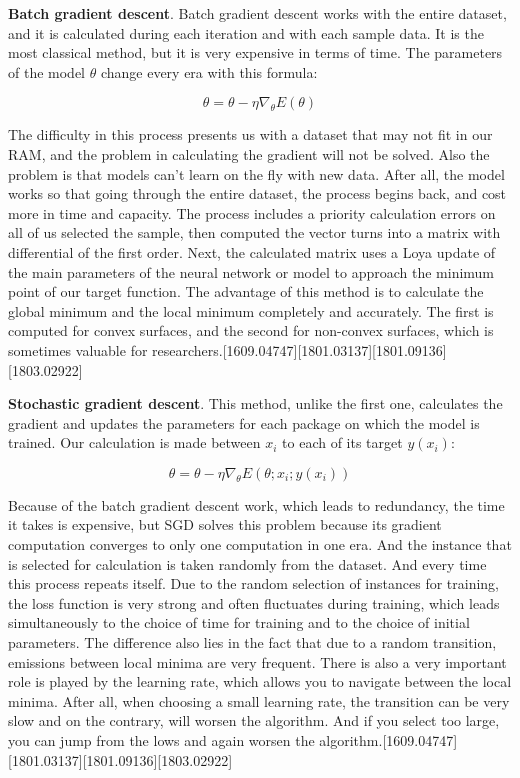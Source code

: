 \par \textbf{Batch gradient descent}. Batch gradient descent works with the entire dataset, and it is calculated during each iteration and with each sample data. It is the most classical method, but it is very expensive in terms of time. The parameters of the model $\theta$ change every era with this formula:


\begin{equation}
\theta = \theta - \eta\nabla_{\theta}E(\theta)
\end{equation}

\par The difficulty in this process presents us with a dataset that may not fit in our RAM, and the problem in calculating the gradient will not be solved. Also the problem is that models can't learn on the fly with new data. After all, the model works so that going through the entire dataset, the process begins back, and cost more in time and capacity. The process includes a priority calculation errors on all of us selected the sample, then computed the vector turns into a matrix with differential of the first order. Next, the calculated matrix uses a Loya update of the main parameters of the neural network or model to approach the minimum point of our target function. The advantage of this method is to calculate the global minimum and the local minimum completely and accurately. The first is computed for convex surfaces, and the second for non-convex surfaces, which is sometimes valuable for researchers.[1609.04747][1801.03137][1801.09136][1803.02922]

\par \textbf{Stochastic gradient descent}. This method, unlike the first one, calculates the gradient and updates the parameters for each package on which the model is trained. Our calculation is made between $x_i$ to each of its target $y(x_i)$:

\begin{equation}
\theta = \theta- {\eta}{\nabla_\theta}E(\theta;x_i;y(x_i))
\end{equation}

\par Because of the batch gradient descent work, which leads to redundancy, the time it takes is expensive, but SGD solves this problem because its gradient computation converges to only one computation in one era. And the instance that is selected for calculation is taken randomly from the dataset. And every time this process repeats itself. Due to the random selection of instances for training, the loss function is very strong and often fluctuates during training, which leads simultaneously to the choice of time for training and to the choice of initial parameters. The difference also lies in the fact that due to a random transition, emissions between local minima are very frequent. There is also a very important role is played by the learning rate, which allows you to navigate between the local minima. After all, when choosing a small learning rate, the transition can be very slow and on the contrary, will worsen the algorithm. And if you select too large, you can jump from the lows and again worsen the algorithm.[1609.04747][1801.03137][1801.09136][1803.02922]



